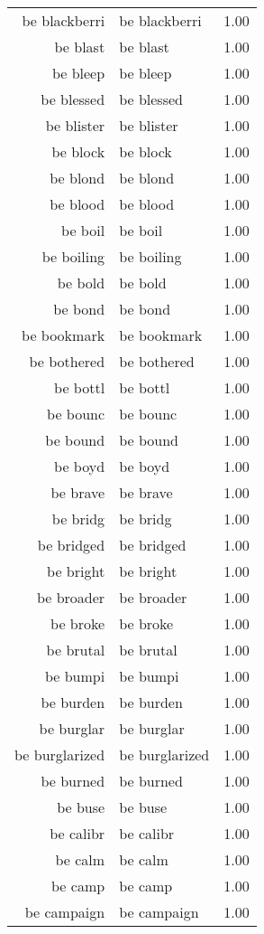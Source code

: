 \begin{table}[ht]
\begin{tabular}{rlr}
  be blackberri & be blackberri & 1.00 \\ 
  be blast & be blast & 1.00 \\ 
  be bleep & be bleep & 1.00 \\ 
  be blessed & be blessed & 1.00 \\ 
  be blister & be blister & 1.00 \\ 
  be block & be block & 1.00 \\ 
  be blond & be blond & 1.00 \\ 
  be blood & be blood & 1.00 \\ 
  be boil & be boil & 1.00 \\ 
  be boiling & be boiling & 1.00 \\ 
  be bold & be bold & 1.00 \\ 
  be bond & be bond & 1.00 \\ 
  be bookmark & be bookmark & 1.00 \\ 
  be bothered & be bothered & 1.00 \\ 
  be bottl & be bottl & 1.00 \\ 
  be bounc & be bounc & 1.00 \\ 
  be bound & be bound & 1.00 \\ 
  be boyd & be boyd & 1.00 \\ 
  be brave & be brave & 1.00 \\ 
  be bridg & be bridg & 1.00 \\ 
  be bridged & be bridged & 1.00 \\ 
  be bright & be bright & 1.00 \\ 
  be broader & be broader & 1.00 \\ 
  be broke & be broke & 1.00 \\ 
  be brutal & be brutal & 1.00 \\ 
  be bumpi & be bumpi & 1.00 \\ 
  be burden & be burden & 1.00 \\ 
  be burglar & be burglar & 1.00 \\ 
  be burglarized & be burglarized & 1.00 \\ 
  be burned & be burned & 1.00 \\ 
  be buse & be buse & 1.00 \\ 
  be calibr & be calibr & 1.00 \\ 
  be calm & be calm & 1.00 \\ 
  be camp & be camp & 1.00 \\ 
  be campaign & be campaign & 1.00 \\ 

\end{tabular}
\end{table}
